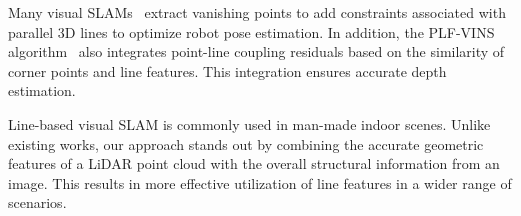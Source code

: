 Many visual SLAMs~\cite{georgis2022vp, lee2021plf, lim2022uv, wang2021vanishing} extract vanishing points to add constraints associated with parallel 3D lines to optimize robot pose estimation.
In addition, the PLF-VINS algorithm~\cite{lee2021plf} also integrates point-line coupling residuals based on the similarity of corner points and line features.
This integration ensures accurate depth estimation.

Line-based visual SLAM is commonly used in man-made indoor scenes. Unlike existing works, our approach stands out by combining the accurate geometric features of a LiDAR point cloud with the overall structural information from an image. This results in more effective utilization of line features in a wider range of scenarios.


